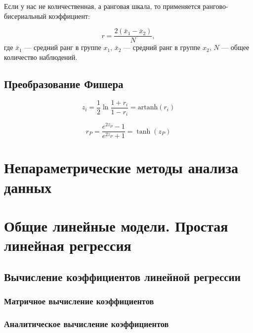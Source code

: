 \documentclass[
  letterpaper,
  DIV=11,
  numbers=noendperiod]{scrreprt}
\newcommand{\artanh}{\text{artanh}}
\theoremstyle{definition}
\theoremstyle{remark}
\begin{document}
Если у нас не количественная, а ранговая шкала, то применяется
рангово-бисериальный коэффициент:

\[
r = \frac{2(\bar x_1 - \bar x_2)}{N},
\] где \(\bar x_1\) --- средний ранг в группе \(x_1\), \(\bar x_2\) ---
средний ранг в группе \(x_2\), \(N\) --- общее количество наблюдений.

\section{Преобразование Фишера}\label{andan-cor-fisher-transform}

\[
z_i = \frac{1}{2} \ln \frac{1 + r_i}{1 - r_i} = \artanh (r_i)
\]

\[
r_P = \dfrac{e^{2z_P} - 1}{e^{2z_P} + 1} = \tanh(z_P)
\]


\chapter{Непараметрические методы анализа данных}\label{andan-nonparam}


\chapter{Общие линейные модели. Простая линейная
регрессия}\label{andan-simplelinear}

\section{Вычисление коэффициентов линейной
регрессии}\label{ux432ux44bux447ux438ux441ux43bux435ux43dux438ux435-ux43aux43eux44dux444ux444ux438ux446ux438ux435ux43dux442ux43eux432-ux43bux438ux43dux435ux439ux43dux43eux439-ux440ux435ux433ux440ux435ux441ux441ux438ux438}

\subsection{Матричное вычисление
коэффициентов}\label{ux43cux430ux442ux440ux438ux447ux43dux43eux435-ux432ux44bux447ux438ux441ux43bux435ux43dux438ux435-ux43aux43eux44dux444ux444ux438ux446ux438ux435ux43dux442ux43eux432}

\subsection{Аналитическое вычисление
коэффициентов}\label{ux430ux43dux430ux43bux438ux442ux438ux447ux435ux441ux43aux43eux435-ux432ux44bux447ux438ux441ux43bux435ux43dux438ux435-ux43aux43eux44dux444ux444ux438ux446ux438ux435ux43dux442ux43eux432}
\end{document}
